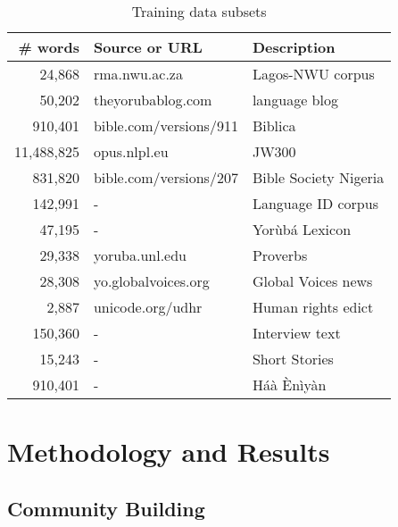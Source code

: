 \documentclass{article} %
\begin{document}
 \begin{table}[h]
  \caption{Training data subsets}
  \label{tab:training_datasets}
  \centering
  \begin{tabular}{rll}
    \toprule
    \textbf{\# words} & \textbf{Source or URL}  & \textbf{Description} \\
    \midrule
    24,868 & rma.nwu.ac.za  & Lagos-NWU corpus \\  
    50,202 & theyorubablog.com & language blog\\  
    910,401 & bible.com/versions/911 & Biblica \\
    \midrule
    11,488,825 & opus.nlpl.eu & JW300 \\
    831,820 & bible.com/versions/207 & Bible Society Nigeria \\
    142,991 & - & Language ID corpus \\
    47,195 & - & Yor{\`u}b{\'a} Lexicon \\
    29,338 & yoruba.unl.edu & Proverbs \\
    28,308 & yo.globalvoices.org & Global Voices news \\
    2,887 & unicode.org/udhr & Human rights edict \\

    \midrule
    150,360 & - & Interview text \\
    15,243 & - & Short Stories \\
    910,401 & - & Háà Ènìyàn \\

    \bottomrule
  \end{tabular}
\end{table}



\section{Methodology and Results}\label{sec:methods}


\subsection{Community Building}
\label{subsec:communitybuilding}



\end{document}
